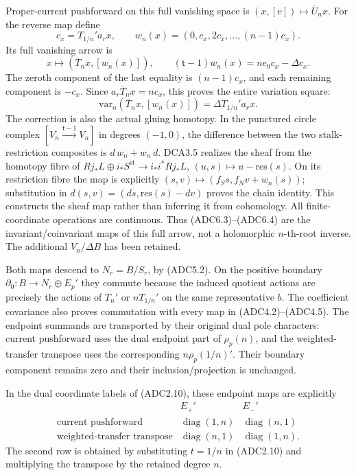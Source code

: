 Proper-current pushforward on this full vanishing space is
\((x,[v])\mapsto\overline U_nx\). For the reverse map define \[
c_x=T_{1/n}'a_rx,\qquad
w_n(x)=(0,c_x,2c_x,\ldots,(n-1)c_x).
\] Its full vanishing arrow is \[
x\longmapsto(\overline T_nx,[w_n(x)]),\qquad
(\mathsf t-1)w_n(x)=ne_0c_x-\Delta c_x.
\tag{ADC6.7}
\] The zeroth component of the last equality is \((n-1)c_x\), and each
remaining component is \(-c_x\). Since \(a_r\overline T_nx=nc_x\), this
proves the entire variation square: \[
\mathrm{var}_n(\overline T_nx,[w_n(x)])
=\Delta T_{1/n}'a_rx.
\tag{ADC6.8}
\] The correction is also the actual gluing homotopy. In the punctured
circle complex \([V_n\xrightarrow{\mathsf t-1}V_n]\) in degrees
\((-1,0)\), the difference between the two stalk-restriction composites
is \(d\,w_n+w_n\,d\). DCA3.5 realizes the sheaf from the homotopy fibre
of \(Rj_*L\oplus i_*S^{\mathrm{st}}\to i_*i^*Rj_*L\),
\((u,s)\mapsto u-\mathrm{res}(s)\). On its restriction fibre the map is
explicitly \((s,v)\mapsto(f_Ss,f_Nv+w_n(s))\); substitution in
\(d(s,v)=(ds,\mathrm{res}(s)-dv)\) proves the chain identity. This
constructs the sheaf map rather than inferring it from cohomology. All
finite-coordinate operations are continuous. Thus (ADC6.3)--(ADC6.4) are
the invariant/coinvariant maps of this full arrow, not a holomorphic
\(n\)-th-root inverse. The additional \(V_n/\Delta B\) has been
retained.

Both maps descend to \(N_r=B/S_r\), by (ADC5.2). On the positive
boundary \(\partial_0:B\to N_r\oplus E_p'\) they commute because the
induced quotient actions are precisely the actions of \(T_n'\) or
\(nT_{1/n}'\) on the same representative \(b\). The coefficient
covariance also proves commutation with every map in (ADC4.2)--(ADC4.5).
The endpoint summands are transported by their original dual pole
characters: current pushforward uses the dual endpoint part of
\(\rho_p(n)\), and the weighted-transfer transpose uses the
corresponding \(n\rho_p(1/n)'\). Their boundary component remains zero
and their inclusion/projection is unchanged.

In the dual coordinate labels of (ADC2.10), these endpoint maps are
explicitly \[
\begin{array}{c|cc}
&E_+'&E_-'\\ \hline
\text{current pushforward}&\operatorname{diag}(1,n)&\operatorname{diag}(n,1)\\
\text{weighted-transfer transpose}&\operatorname{diag}(n,1)&\operatorname{diag}(1,n).
\end{array}
\tag{ADC6.5}
\] The second row is obtained by substituting \(t=1/n\) in (ADC2.10) and
multiplying the transpose by the retained degree \(n\).


